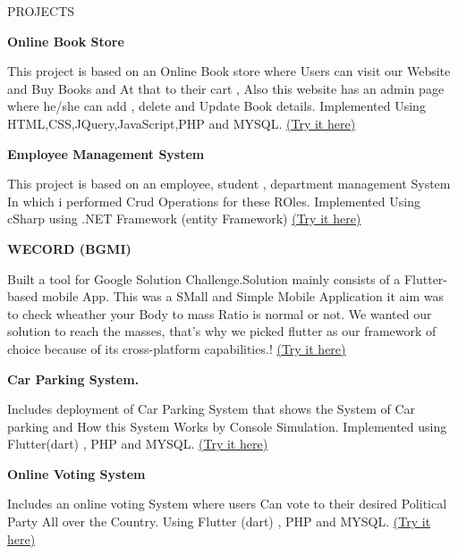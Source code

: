\documentclass{resume}
\begin{document}
\begin{rSection}{PROJECTS}
\vspace{-1.25em}

\item \textbf{Online Book Store}\itemsep -3pt {} 
     \item {This project is based on an Online Book store where Users can visit our Website and Buy Books and At that to their cart , Also this website has an admin page where he/she can add , delete and Update Book details.
Implemented Using HTML,CSS,JQuery,JavaScript,PHP and MYSQL.
}
\href{https://github.com/GurusGeek/Online-Book-Store}{(Try it here)}

\item \textbf{Employee Management System} 
\itemsep -3pt {} 
     \item {This project is based on an employee, student , department management System In which i performed Crud Operations for these ROles.
Implemented Using cSharp using .NET Framework (entity Framework)
}
\href{https://github.com/GurusGeek/Student-Department-employee-Managment-System}{(Try it here)}

\item \textbf{WECORD (BGMI)} \itemsep -3pt {} 
     \item {Built a tool for Google Solution Challenge.Solution mainly consists of a Flutter-based mobile App.
This was a SMall and Simple Mobile Application it aim was to check wheather your Body to mass Ratio is normal or not. We wanted our solution to reach the masses, that's why we picked flutter as our framework of choice because of its cross-platform capabilities.! \href{https://github.com/GurusGeek/project}{(Try it here)}}
\item \textbf{Car Parking System.} \itemsep -3pt {} 
     \item {Includes deployment of Car Parking System that shows the System of Car parking and  How this System Works by Console Simulation.
Implemented using Flutter(dart) , PHP and MYSQL.}
\href{https://github.com/GurusGeek/CAR-PARKING_SYSTEM}{(Try it here)}

\item \textbf{Online Voting System}  \itemsep -3pt {} 
     \item {Includes an online voting System where users Can vote to their desired Political Party All over the Country. Using Flutter (dart) , PHP and MYSQL.
}
\href{https://github.com/GurusGeek/online-voting-system}{(Try it here)}
\end{rSection} 
\end{document}
